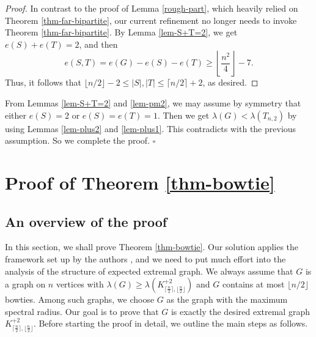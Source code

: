 \documentclass[11pt]{article}
\begin{document}
\begin{proof}
In contrast to the proof of Lemma \ref{rough-part}, 
which heavily relied on Theorem \ref{thm-far-bipartite}, 
our current refinement no longer needs to invoke Theorem \ref{thm-far-bipartite}. 
By Lemma \ref{lem-S+T=2}, we get $e(S)+e(T)=2$, and then   
\[   e(S,T)= e(G) - e(S)- e(T) 
\ge \left\lfloor \frac{n^2}{4} \right\rfloor -7. \]  
Thus, it follows that 
$ \lfloor {n}/{2} \rfloor -2 \le |S|,|T| 
\le \lceil {n}/{2} \rceil +2$, as desired. 
\end{proof}

From Lemmas \ref{lem-S+T=2} and \ref{lem-pm2},  
we may assume by symmetry that either $e(S)=2$ or $e(S)=e(T)=1$.  
Then we get $\lambda (G)< \lambda (T_{n,2})$  
 by using Lemmas \ref{lem-plus2} 
and \ref{lem-plus1}. This contradicts with the previous assumption. 
So we complete the proof. \hfill $\square$ 







\section{Proof of Theorem \ref{thm-bowtie}}
\label{sec6}


\subsection{An overview of the proof}
In this section, we shall prove Theorem \ref{thm-bowtie}. 
Our solution applies the framework set up by the authors  \cite{LFP2024-triangular},  
and we need to put much effort into the analysis of the structure 
of expected extremal graph. 
We always assume that $G$ is a graph on $n$  vertices with 
$\lambda (G) \ge \lambda (K_{\lceil \frac{n}{2} \rceil, \lfloor \frac{n}{2} \rfloor}^{+2})$ 
and $G$ contains at most  $\lfloor n/2\rfloor $ bowties. 
Among such graphs, we choose $G$ as the graph with the maximum spectral radius. 
Our goal is to prove that $G$ 
is exactly 
the desired extremal graph $K_{\lceil \frac{n}{2} \rceil, \lfloor \frac{n}{2} \rfloor}^{+2}$. 
Before starting the proof in detail, we outline the main steps as follows. 
\end{document}
